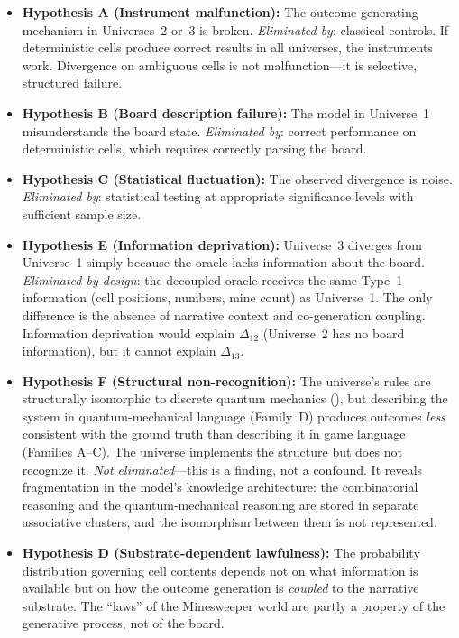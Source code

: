 \documentclass[12pt,a4paper]{article}
\begin{document}
\begin{itemize}[nosep]
    \item \textbf{Hypothesis A (Instrument malfunction):} The outcome-generating mechanism in Universes~2 or~3 is broken. \emph{Eliminated by}: classical controls. If deterministic cells produce correct results in all universes, the instruments work. Divergence on ambiguous cells is not malfunction---it is selective, structured failure.
    \item \textbf{Hypothesis B (Board description failure):} The model in Universe~1 misunderstands the board state. \emph{Eliminated by}: correct performance on deterministic cells, which requires correctly parsing the board.
    \item \textbf{Hypothesis C (Statistical fluctuation):} The observed divergence is noise. \emph{Eliminated by}: statistical testing at appropriate significance levels with sufficient sample size.
    \item \textbf{Hypothesis E (Information deprivation):} Universe~3 diverges from Universe~1 simply because the oracle lacks information about the board. \emph{Eliminated by design}: the decoupled oracle receives the same Type~1 information (cell positions, numbers, mine count) as Universe~1. The only difference is the absence of narrative context and co-generation coupling. Information deprivation would explain $\Delta_{12}$ (Universe~2 has no board information), but it cannot explain $\Delta_{13}$.
    \item \textbf{Hypothesis F (Structural non-recognition):} The universe's rules are structurally isomorphic to discrete quantum mechanics (), but describing the system in quantum-mechanical language (Family~D) produces outcomes \emph{less} consistent with the ground truth than describing it in game language (Families A--C). The universe implements the structure but does not recognize it. \emph{Not eliminated}---this is a finding, not a confound. It reveals fragmentation in the model's knowledge architecture: the combinatorial reasoning and the quantum-mechanical reasoning are stored in separate associative clusters, and the isomorphism between them is not represented.
    \item \textbf{Hypothesis D (Substrate-dependent lawfulness):} The probability distribution governing cell contents depends not on what information is available but on how the outcome generation is \emph{coupled} to the narrative substrate. The ``laws'' of the Minesweeper world are partly a property of the generative process, not of the board.
\end{itemize}
\end{document}

